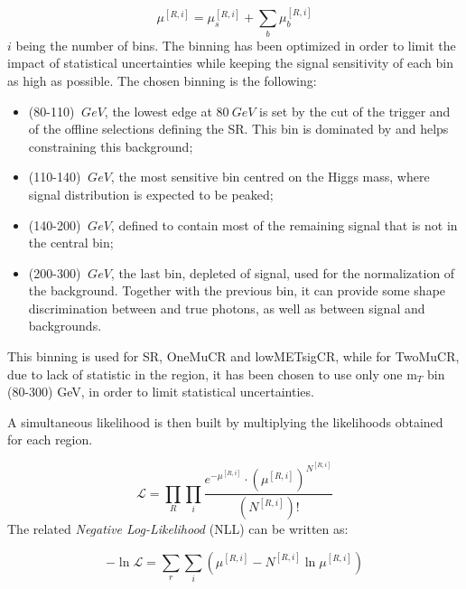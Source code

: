 \begin{equation}
   \mu^{[R,i]}=\mu_s^{[R,i]}+\sum_b \mu_b^{[R,i]} 
\end{equation}
\noindent
$i$ being the number of \mT bins. The binning has been optimized in order to limit the impact of statistical uncertainties while keeping the signal sensitivity of each bin as high as possible. The chosen \mT binning is the following: 
\begin{itemize}
    \item (80-110) $\SI{}{GeV}$, the lowest edge at $\SI{80}{GeV}$ is set by the cut of the trigger and of the offline selections defining the SR. This bin is dominated by \efakey and helps constraining this background; 
    \item (110-140) $\SI{}{GeV}$, the most sensitive bin centred on the Higgs mass, where signal distribution is expected to be peaked; 
    \item (140-200) $\SI{}{GeV}$, defined to contain most of the remaining signal that is not in the central bin;
    \item (200-300) $\SI{}{GeV}$, the last bin, depleted of signal, used for the normalization of the background. Together with the previous bin, it can provide some shape discrimination between \jfakey and true photons, as well as between signal and backgrounds. 
\end{itemize}
This binning is used for SR, OneMuCR and lowMETsigCR, while for TwoMuCR, due to lack of statistic in the region, it has been chosen to use only one m${_T}$ bin (80-300) GeV, in order to limit statistical uncertainties.




A simultaneous likelihood is then built by multiplying the likelihoods obtained for each region.


\begin{equation}
    \mathcal{L}=\prod_R \prod_i \frac{e^{-\mu^{[R,i]}}\cdot (\mu^{[R,i]})^{N^{[R,i]}}}{(N^{[R,i]})!}
\end{equation}
The related \textit{Negative Log-Likelihood} (NLL) can be written as: 

\begin{equation}
-\ln\mathcal{L}=\sum_r\sum_i(\mu^{[R,i]}-N^{[R,i]}\ln\mu^{[R,i]}) 
\end{equation} 

